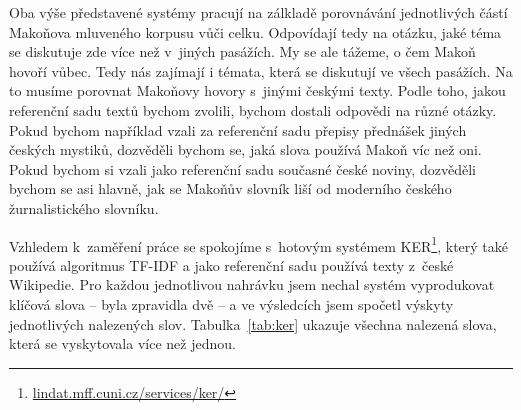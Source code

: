Oba výše představené systémy pracují na zálkladě porovnávání jednotlivých částí
Makoňova mluveného korpusu vůči celku. Odpovídají tedy na otázku, jaké téma se
diskutuje zde více než v~jiných pasážích. My se ale tážeme, o čem Makoň hovoří
vůbec. Tedy nás zajímají i témata, která se diskutují ve všech pasážích. Na to
musíme porovnat Makoňovy hovory s~jinými českými texty. Podle toho, jakou
referenční sadu textů bychom zvolili, bychom dostali odpovědi na různé otázky.
Pokud bychom například vzali za referenční sadu přepisy přednášek jiných českých
mystiků, dozvěděli bychom se, jaká slova používá Makoň víc než oni. Pokud bychom
si vzali jako referenční sadu současné české noviny, dozvěděli bychom se asi
hlavně, jak se Makoňův slovník liší od moderního českého žurnalistického
slovníku.

Vzhledem k~zaměření práce se spokojíme s~hotovým systémem
KER\footnote{\url{lindat.mff.cuni.cz/services/ker/}}, který také používá
algoritmus TF-IDF a jako referenční sadu používá texty z~české Wikipedie.
Pro každou jednotlivou nahrávku jsem nechal systém vyprodukovat klíčová slova --
byla zpravidla dvě -- a ve výsledcích jsem spočetl výskyty jednotlivých
nalezených slov.
Tabulka~\ref{tab:ker} ukazuje všechna nalezená slova, která se vyskytovala více
než jednou.

